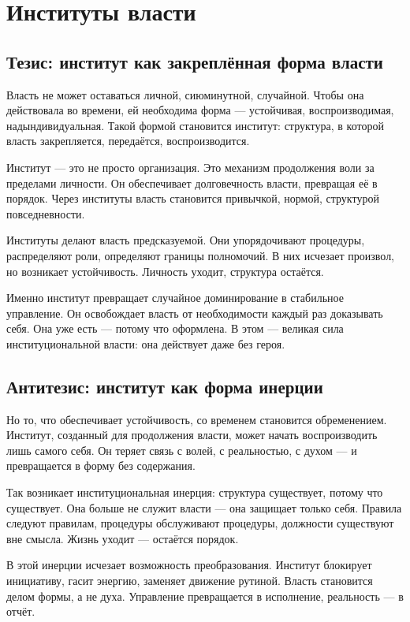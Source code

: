 \chapter{Институты власти}

\section{Тезис: институт как закреплённая форма власти}

Власть не может оставаться личной, сиюминутной, случайной. Чтобы она действовала во времени, ей необходима форма — устойчивая, воспроизводимая, надындивидуальная. Такой формой становится институт: структура, в которой власть закрепляется, передаётся, воспроизводится.

Институт — это не просто организация. Это механизм продолжения воли за пределами личности. Он обеспечивает долговечность власти, превращая её в порядок. Через институты власть становится привычкой, нормой, структурой повседневности.

Институты делают власть предсказуемой. Они упорядочивают процедуры, распределяют роли, определяют границы полномочий. В них исчезает произвол, но возникает устойчивость. Личность уходит, структура остаётся.

Именно институт превращает случайное доминирование в стабильное управление. Он освобождает власть от необходимости каждый раз доказывать себя. Она уже есть — потому что оформлена. В этом — великая сила институциональной власти: она действует даже без героя.

\section{Антитезис: институт как форма инерции}

Но то, что обеспечивает устойчивость, со временем становится обременением. Институт, созданный для продолжения власти, может начать воспроизводить лишь самого себя. Он теряет связь с волей, с реальностью, с духом — и превращается в форму без содержания.

Так возникает институциональная инерция: структура существует, потому что существует. Она больше не служит власти — она защищает только себя. Правила следуют правилам, процедуры обслуживают процедуры, должности существуют вне смысла. Жизнь уходит — остаётся порядок.

В этой инерции исчезает возможность преобразования. Институт блокирует инициативу, гасит энергию, заменяет движение рутиной. Власть становится делом формы, а не духа. Управление превращается в исполнение, реальность — в отчёт.

